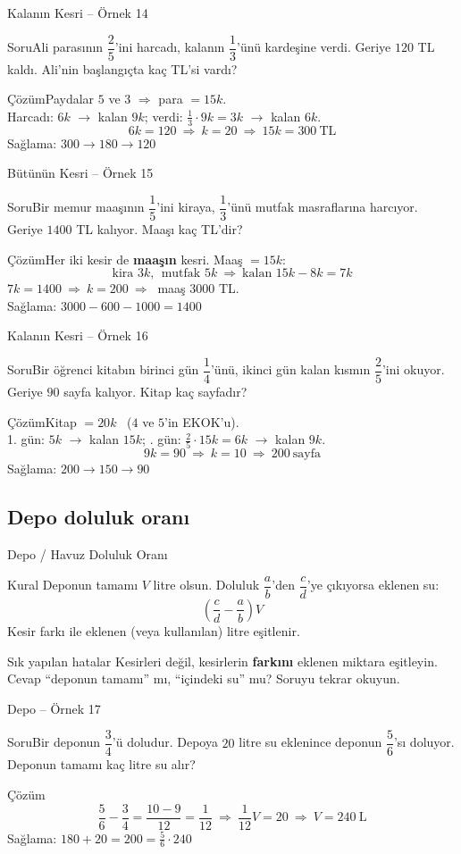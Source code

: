 \documentclass[aspectratio=169,11pt,handout]{beamer}
\newcommand{\soru}[3]{%
\begin{frame}{#1}
  \begin{block}{Soru}\large #2\end{block}
  \pause
  \begin{exampleblock}{Çözüm}\large #3\end{exampleblock}
\end{frame}}
\begin{document}
\soru{Kalanın Kesri -- Örnek 14}
{Ali parasının \(\dfrac{2}{5}\)'ini harcadı, kalanın \(\dfrac{1}{3}\)'ünü kardeşine verdi. Geriye \(120\) TL kaldı. Ali'nin başlangıçta kaç TL'si vardı?}
{Paydalar \(5\) ve \(3\) \(\Rightarrow\) para \(=15k\).\\[2pt]
Harcadı: \(6k\) \(\to\) kalan \(9k\); \quad verdi: \(\frac{1}{3}\cdot 9k=3k\) \(\to\) kalan \(6k\).
\[6k=120\ \Rightarrow\ k=20\ \Rightarrow\ 15k=300\ \text{TL}\]
Sağlama: \(300\to 180\to 120\) \checkmark}

\soru{Bütünün Kesri -- Örnek 15}
{Bir memur maaşının \(\dfrac{1}{5}\)'ini kiraya, \(\dfrac{1}{3}\)'ünü mutfak masraflarına harcıyor. Geriye \(1400\) TL kalıyor. Maaşı kaç TL'dir?}
{Her iki kesir de \textbf{maaşın} kesri. Maaş \(=15k\):
\[\text{kira } 3k,\ \ \text{mutfak } 5k\ \Rightarrow\ \text{kalan } 15k-8k=7k\]
\(7k=1400\ \Rightarrow\ k=200\ \Rightarrow\ \) maaş \(3000\) TL.\\[3pt]
Sağlama: \(3000-600-1000=1400\) \checkmark}

\soru{Kalanın Kesri -- Örnek 16}
{Bir öğrenci kitabın birinci gün \(\dfrac{1}{4}\)'ünü, ikinci gün kalan kısmın \(\dfrac{2}{5}\)'ini okuyor. Geriye \(90\) sayfa kalıyor. Kitap kaç sayfadır?}
{Kitap \(=20k\) \ (\(4\) ve \(5\)'in EKOK'u).\\[2pt]
1. gün: \(5k\) \(\to\) kalan \(15k\); \quad 2. gün: \(\frac{2}{5}\cdot 15k=6k\) \(\to\) kalan \(9k\).
\[9k=90\ \Rightarrow\ k=10\ \Rightarrow\ 200\ \text{sayfa}\]
Sağlama: \(200\to 150\to 90\) \checkmark}

\subsection{Depo doluluk oranı}
\begin{frame}{Depo / Havuz Doluluk Oranı}
\begin{block}{Kural}
Deponun tamamı \(V\) litre olsun. Doluluk \(\dfrac{a}{b}\)'den \(\dfrac{c}{d}\)'ye çıkıyorsa eklenen su:
\[\left(\frac{c}{d}-\frac{a}{b}\right)V\]
Kesir farkı ile eklenen (veya kullanılan) litre eşitlenir.
\end{block}
\begin{alertblock}{Sık yapılan hatalar}
Kesirleri değil, kesirlerin \textbf{farkını} eklenen miktara eşitleyin. Cevap ``deponun tamamı'' mı, ``içindeki su'' mu? Soruyu tekrar okuyun.
\end{alertblock}
\end{frame}

\soru{Depo -- Örnek 17}
{Bir deponun \(\dfrac{3}{4}\)'ü doludur. Depoya \(20\) litre su eklenince deponun \(\dfrac{5}{6}\)'sı doluyor. Deponun tamamı kaç litre su alır?}
{\[\frac{5}{6}-\frac{3}{4}=\frac{10-9}{12}=\frac{1}{12}\ \Rightarrow\ \frac{1}{12}V=20\ \Rightarrow\ V=240\ \text{L}\]
Sağlama: \(180+20=200=\frac{5}{6}\cdot 240\) \checkmark}
\end{document}
